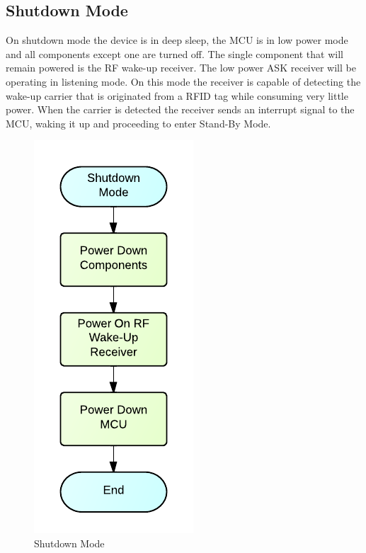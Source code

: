 \subsection{Shutdown Mode}
On shutdown mode the device is in deep sleep, the MCU is in low power mode and all components except one are turned off. The single component that will remain powered is the RF wake-up receiver. The low power ASK receiver will be operating in listening mode. On this mode the receiver is capable of detecting the wake-up carrier that is originated from a RFID tag while consuming very little power. When the carrier is detected the receiver sends an interrupt signal to the MCU, waking it up and proceeding to enter Stand-By Mode.
\begin{figure}[H]
	\centering
	\includegraphics[scale=1.0]{img/ShutdownMode}
	\caption{Shutdown Mode \label{fig:shutdownMode}}
\end{figure}

